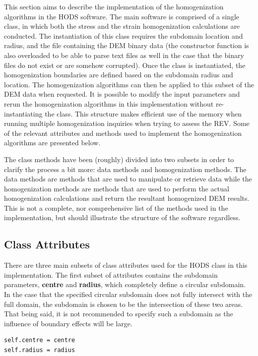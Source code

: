 This section aims to describe the implementation of the homogenization algorithms in the HODS software. The main software is comprised of a single class, in which both the stress and the strain homogenization calculations are conducted. The instantiation of this class requires the subdomain location and radius, and the file containing the DEM binary data (the constructor function is also overloaded to be able to parse text files as well in the case that the binary files do not exist or are somehow corrupted). Once the class is instantiated, the homogenization boundaries are defined based on the subdomain radius and location. The homogenization algorithms can then be applied to this subset of the DEM data when requested. It is possible to modify the input parameters and rerun the homogenization algorithms in this implementation without re-instantiating the class. This structure makes efficient use of the memory when running multiple homogenization inquiries when trying to assess the REV. Some of the relevant attributes and methods used to implement the homogenization algorithms are presented below. 

The class methods have been (roughly) divided into two subsets in order to clarify the process a bit more: data methods and homogenization methods. The data methods are methods that are used to manipulate or retrieve data while the homogenization methods are methods that are used to perform the actual homogenization calculations and return the resultant homogenized DEM results. This is not a complete, nor comprehensive list of the methods used in the implementation, but should illustrate the structure of the software regardless.

\subsection{Class Attributes}

There are three main subsets of class attributes used for the HODS class in this implementation. The first subset of attributes contains the subdomain parameters, \textbf{centre} and \textbf{radius}, which completely define a circular subdomain. In the case that the specified circular subdomain does not fully intersect with the full domain, the subdomain is chosen to be the intersection of these two areas. That being said, it is not recommended to specify such a subdomain as the influence of boundary effects will be large.

\begin{lstlisting}[frame=single] 
self.centre = centre
self.radius = radius
\end{lstlisting}

